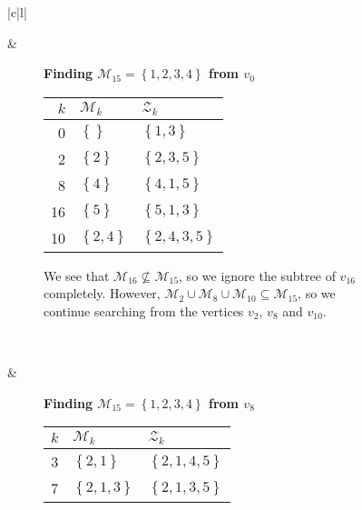 
\begin{figure}[ht!]
    \centering
    \begin{tabular}[t]{|c|l|}\hline
    \begin{subfigure}[b]{0.35\textwidth}
        \centering
        
    \end{subfigure}
    & 
    \begin{subfigure}[b]{0.64\textwidth}
        \textbf{Finding $\mathcal{M}_{15} = \left\{{1,2,3,4}\right\}$ from $v_0$} \\
        \begin{tabular}{rll}
            $k$ & $\mathcal{M}_k$            & $\mathcal{Z}_k$ \\ \hline
            0   & $\left\{{}\right\}$        & $\left\{{1,3}\right\}$ \\ 
            2   & $\left\{{2}\right\}$       & $\left\{{2,3,5}\right\}$ \\ 
            8   & $\left\{{4}\right\}$       & $\left\{{4,1,5}\right\}$ \\ 
            16  & $\left\{{5}\right\}$       & $\left\{{5,1,3}\right\}$ \\ 
            10  & $\left\{{2,4}\right\}$     & $\left\{{2,4,3,5}\right\}$ \\ 
        \end{tabular}

        We see that $\mathcal{M}_{16} \not \subseteq \mathcal{M}_{15}$, so we
        ignore the subtree of $v_{16}$ completely. However, $\mathcal{M}_2 \cup
        \mathcal{M}_8 \cup \mathcal{M}_{10} \subseteq \mathcal{M}_{15}$, so we
        continue searching from the vertices $v_2$, $v_8$ and $v_{10}$.
    \end{subfigure}
    \\ \hline
    \begin{subfigure}[b]{0.35\textwidth}
        \centering
        
    \end{subfigure}
    & 
    \begin{subfigure}[b]{0.64\textwidth}
        \textbf{Finding $\mathcal{M}_{15} = \left\{{1,2,3,4}\right\}$ from $v_8$} \\
        \begin{tabular}{rll}
            $k$ & $\mathcal{M}_k$            & $\mathcal{Z}_k$ \\ \hline
            3       & $\left\{{2,1}\right\}$     & $\left\{{2,1,4,5}\right\}$ \\ 
            7       & $\left\{{2,1,3}\right\}$   & $\left\{{2,1,3,5}\right\}$ \\ 
        \end{tabular}


\end{subfigure}
\end{tabular}
\end{figure}
